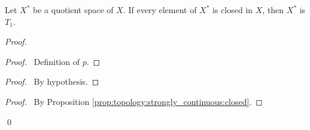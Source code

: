 \begin{prop}
  Let $X^*$ be a quotient space of $X$. If every element of $X^*$ is closed
  in
  $X$, then $X^*$ is $T_1$.
\end{prop}

\begin{proof}
  \pf
  \begin{proof}
    \pf\ Definition of $p$.
  \end{proof}
  \begin{proof}
    \pf\ By hypothesis.
  \end{proof}
  \begin{proof}
    \pf\ By Proposition \ref{prop:topology:strongly_continuous:closed}.
  \end{proof}
  \qed
\end{proof}
